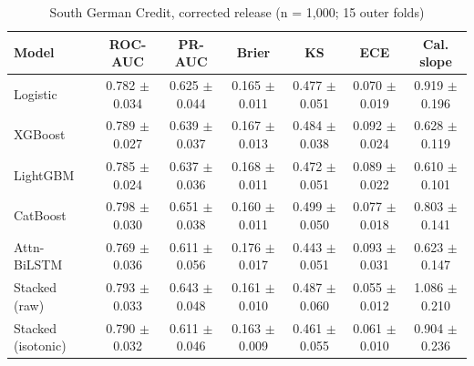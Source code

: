 \documentclass[conference,a4paper]{IEEEtran}
\begin{document}
\begin{table}[!t]
\caption{South German Credit, corrected release (n = 1,000; 15 outer folds)}
\centering
\footnotesize
\renewcommand{\arraystretch}{1.1}
\begin{tabular}{lcccccc}
\toprule
Model & ROC-AUC & PR-AUC & Brier & KS & ECE & Cal. slope \\
\midrule
Logistic & 0.782 $\pm$ 0.034 & 0.625 $\pm$ 0.044 & 0.165 $\pm$ 0.011 & 0.477 $\pm$ 0.051 & 0.070 $\pm$ 0.019 & 0.919 $\pm$ 0.196 \\
XGBoost & 0.789 $\pm$ 0.027 & 0.639 $\pm$ 0.037 & 0.167 $\pm$ 0.013 & 0.484 $\pm$ 0.038 & 0.092 $\pm$ 0.024 & 0.628 $\pm$ 0.119 \\
LightGBM & 0.785 $\pm$ 0.024 & 0.637 $\pm$ 0.036 & 0.168 $\pm$ 0.011 & 0.472 $\pm$ 0.051 & 0.089 $\pm$ 0.022 & 0.610 $\pm$ 0.101 \\
CatBoost & 0.798 $\pm$ 0.030 & 0.651 $\pm$ 0.038 & 0.160 $\pm$ 0.011 & 0.499 $\pm$ 0.050 & 0.077 $\pm$ 0.018 & 0.803 $\pm$ 0.141 \\
Attn-BiLSTM & 0.769 $\pm$ 0.036 & 0.611 $\pm$ 0.056 & 0.176 $\pm$ 0.017 & 0.443 $\pm$ 0.051 & 0.093 $\pm$ 0.031 & 0.623 $\pm$ 0.147 \\
Stacked (raw) & 0.793 $\pm$ 0.033 & 0.643 $\pm$ 0.048 & 0.161 $\pm$ 0.010 & 0.487 $\pm$ 0.060 & 0.055 $\pm$ 0.012 & 1.086 $\pm$ 0.210 \\
Stacked (isotonic) & 0.790 $\pm$ 0.032 & 0.611 $\pm$ 0.046 & 0.163 $\pm$ 0.009 & 0.461 $\pm$ 0.055 & 0.061 $\pm$ 0.010 & 0.904 $\pm$ 0.236 \\
\bottomrule
\end{tabular}
\end{table}
\end{document}
